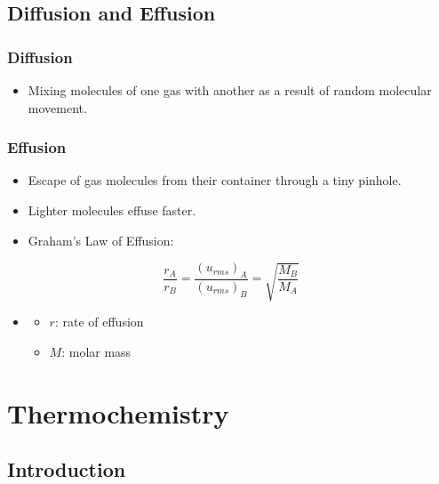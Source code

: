 \documentclass{article}
\begin{document}
\subsection{Diffusion and Effusion}

\subsubsection{Diffusion}

\begin{itemize}
    \item Mixing molecules of one gas with another as a result of random molecular movement.
\end{itemize}

\subsubsection{Effusion}

\begin{itemize}
    \item Escape of gas molecules from their container through a tiny pinhole.
    \item Lighter molecules effuse faster.
    \item Graham's Law of Effusion:
\end{itemize}

\begin{equation*}
    \frac{r_A}{r_B} = \frac{(u_{rms})_A}{(u_{rms})_B} = \sqrt{\frac{M_B}{M_A}}
\end{equation*}

\begin{itemize}
    \item[] \begin{itemize}
        \item $r$: rate of effusion
        \item $M$: molar mass
    \end{itemize}
\end{itemize}

\section{Thermochemistry}

\subsection{Introduction}
\end{document}
